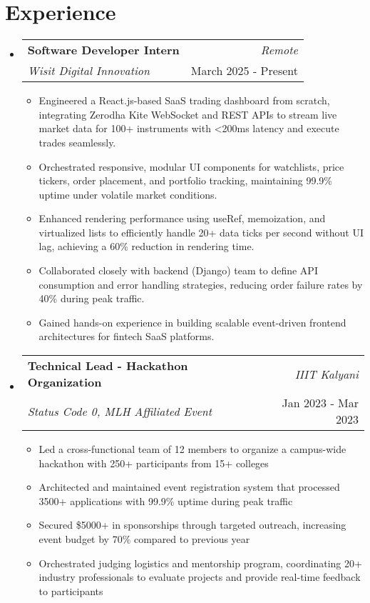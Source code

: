 \documentclass[a4paper,11pt]{article}
\makeatletter
\newcommand{\resumeSubheading}[4]{
\vspace{-1mm}\item
    \begin{tabular*}{0.98\textwidth}[t]{l@{\extracolsep{\fill}}r}
        \textbf{#1} & \textit{\footnotesize{#4}} \\
        \textit{\footnotesize{#3}} &  \footnotesize{#2}\\
    \end{tabular*}
    \vspace{-3mm}
}
\newcommand{\resumeItemListStart}{%
  \begin{justify}
  \begin{itemize}[
    leftmargin=2ex, 
    rightmargin=1ex, 
    itemsep=0mm,    %
    parsep=0pt,     %
    topsep=0pt,     %
    partopsep=0pt,  %
    labelsep=1.2mm
  ]\small
}
\newcommand{\resumeSubHeadingListStart}{\begin{itemize}[leftmargin=*,labelsep=0mm]}
\newcommand{\resumeSubHeadingListEnd}{\end{itemize}\vspace{0mm}}
\newcommand{\resumeItemListEnd}{\end{itemize}\end{justify}\vspace{-2mm}}
\makeatother
\begin{document}
\section{Experience}
\resumeSubHeadingListStart
    \resumeSubheading
        {Software Developer Intern}{March 2025 - Present}
        {Wisit Digital Innovation}{Remote}
        \resumeItemListStart
            \item Engineered a React.js-based SaaS trading dashboard from scratch, integrating Zerodha Kite WebSocket and REST APIs to stream live market data for 100+ instruments with <200ms latency and execute trades seamlessly.
            \item Orchestrated responsive, modular UI components for watchlists, price tickers, order placement, and portfolio tracking, maintaining 99.9\% uptime under volatile market conditions.
            \item Enhanced rendering performance using useRef, memoization, and virtualized lists to efficiently handle 20+ data ticks per second without UI lag, achieving a 60\% reduction in rendering time.
            \item Collaborated closely with backend (Django) team to define API consumption and error handling strategies, reducing order failure rates by 40\% during peak traffic.
            \item Gained hands-on experience in building scalable event-driven frontend architectures for fintech SaaS platforms.
        \resumeItemListEnd
        
    \resumeSubheading
        {Technical Lead - Hackathon Organization}{Jan 2023 - Mar 2023}
        {Status Code 0, MLH Affiliated Event}{IIIT Kalyani}
        \resumeItemListStart
            \item Led a cross-functional team of 12 members to organize a campus-wide hackathon with 250+ participants from 15+ colleges
            \item Architected and maintained event registration system that processed 3500+ applications with 99.9\% uptime during peak traffic
            \item Secured \$5000+ in sponsorships through targeted outreach, increasing event budget by 70\% compared to previous year
            \item Orchestrated judging logistics and mentorship program, coordinating 20+ industry professionals to evaluate projects and provide real-time feedback to participants
        \resumeItemListEnd
\resumeSubHeadingListEnd
\end{document}
